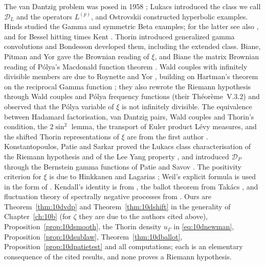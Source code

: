 The van Dantzig problem was posed in 1958 \cite{vandantzig1958}; Lukacs \cite{lukacs1968,lukacs1970} introduced the class we call $\mathcal D_L$ and the operators $L^{(p)}$, and Ostrovskii \cite{ostrovskii1970} constructed hyperbolic examples. Hinds \cite{hinds1974} studied the Gamma and symmetric Beta examples; for the latter see also \cite{amdeberhan2012,jurek2010,hasebesimonwang2018}, and for Bessel hitting times Kent \cite{kent1978}. Thorin \cite{thorin1977} introduced generalized gamma convolutions and Bondesson \cite{bondesson1992} developed them, including the extended class. Biane, Pitman and Yor \cite{bpy2001} gave the Brownian reading of $\xi$, and Biane \cite{biane2009} the matrix Brownian reading of P\'olya's Macdonald function theorem \cite{polya1926}. Wald couples with infinitely divisible members are due to Roynette and Yor \cite{roynetteyor2005}, building on Hartman's theorem on the reciprocal Gamma function \cite{hartman1976}; they also rewrote the Riemann hypothesis through Wald couples and P\'olya frequency functions (their Th\'eor\`eme~V.3.2) and observed that the P\'olya variable of $\xi$ is not infinitely divisible. The equivalence between Hadamard factorisation, van Dantzig pairs, Wald couples and Thorin's condition, the $2\sin^2$ lemma, the transport of Euler product L\'evy measures, and the shifted Thorin representations of $\xi$ are from the first author \cite{polson2017,polson2018vdp}. Konstantopoulos, Patie and Sarkar \cite{konstantopoulospatiesarkar2024} proved the Lukacs class characterisation of the Riemann hypothesis and of the Lee Yang property \cite{leeyang1952,newman1974,newmanwu2020}, and introduced $\mathcal D_P$ through the Bernstein gamma functions of Patie and Savov \cite{patiesavov2018}. The positivity criterion for $\xi$ is due to Hinkkanen \cite{hinkkanen1997} and Lagarias \cite{lagarias1999}; Weil's explicit formula \cite{weil1952} is used in the form of \cite{iwanieckowalski2004}. Kendall's identity is from \cite{kendall1957}, the ballot theorem from Tak\'acs \cite{takacs1967}, and fluctuation theory of spectrally negative processes from \cite{bertoin1996,kyprianou2014}. Ours are Theorem~\ref{thm:10dvdp} and Theorem~\ref{thm:10dshift} in the generality of Chapter~\ref{ch:10b} (for $\zeta$ they are due to the authors cited above), Proposition~\ref{prop:10dsmooth}, the Thorin density $u_\Gamma$ in \eqref{eq:10dnewman}, Proposition~\ref{prop:10dsublaw}, Theorem~\ref{thm:10dballot}, Proposition~\ref{prop:10dpatietest} and all computations; each is an elementary consequence of the cited results, and none proves a Riemann hypothesis.

